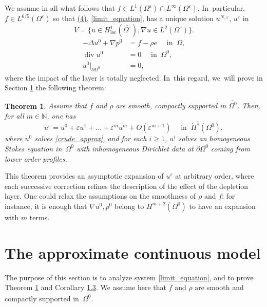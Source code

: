 \documentclass[10pt,a4paper]{amsart}
\newcommand{\loc}{\mathrm{loc}}
\renewcommand{\div}{\operatorname{div}}
\theoremstyle{plain}
\newtheorem{thm}{Theorem}[section]
\theoremstyle{definition}
\let\pa\partial
\let\na\nabla
\let\eps\varepsilon
\newcommand{\N}{\mathbb{N}}
\begin{document}
We assume in all what follows that $f \in L^1(\Omega^\eps) \cap L^\infty(\Omega^\eps)$. In~particular, $f \in L^{6/5}(\Omega^\eps)$ so that \href{https://jep.centre-mersenne.org/item/10.5802/jep.296.pdf#page=5}{(4)}, \resp \eqref{limit_equation}, has a unique solution $u^{N,\eps}$, \resp $u^\eps$ in
\[
V = \{ u \in H^1_{\loc}(\overline{\Omega^\eps}), \na u \in L^2(\Omega^\eps)\}.
\]
\setcounter{thm}{1}
\begin{equation} \label{crude_approx}
\begin{aligned}
-\Delta u^0 + \na p^0 &= f - \rho e \quad \text{ in } \: \Omega, \\
\div u^0 & = 0 \quad \text{ in } \: \Omega^0, \\
u^0 \vert_{\pa \Omega^0} & = 0,
\end{aligned}
\end{equation}
where the impact of the layer is totally neglected. In~this regard, we~will prove in Section \ref{sec_wall_law} the following theorem:
\begin{thm} \label{thm2}
Assume that $f$ and $\rho$ are smooth, compactly supported in $\overline{\Omega^0}$. Then, for all $m \in \N$, one has
\[
u^\eps = u^0 + \eps u^1 + \dots + \eps^m u^m + O(\eps^{m+1}) \quad \text{ in } \: \dot{H}^1(\Omega^0),
\]
where $u^0$ solves \eqref{crude_approx}, and for each $i \ge 1$, $u^i$ solves an homogeneous Stokes equation in~$\Omega^0$ with inhomogeneous Dirichlet data at $\pa \Omega^0$ coming from lower order profiles.
\end{thm}
This theorem provides an asymptotic expansion of $u^\eps$ at arbitrary order, where each successive correction refines the description of the effect of the depletion layer. One could relax the assumptions on the smoothness of $\rho$ and $f$: for instance, it is enough that $\na u^0,p^0$ belong to $H^{m+2}(\Omega^0)$ to have an expansion with $m$ terms.
\setcounter{section}{3}
\section{The approximate continuous model} \label{sec_wall_law}The purpose of this section is to analyze system \eqref{limit_equation}, and to prove Theorem \ref{thm2} and Corollary \href{https://jep.centre-mersenne.org/item/10.5802/jep.296.pdf#page=7}{1.3}. We assume here that $f$ and $\rho$ are smooth and compactly supported in~$\overline{\Omega^0}$.
\end{document}
